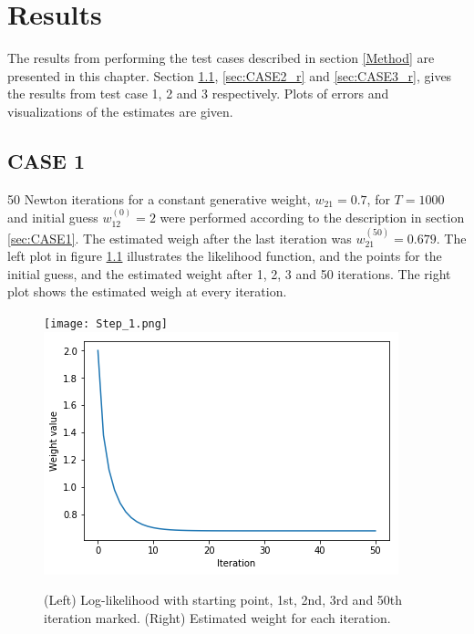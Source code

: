 
\chapter{Results}
\label{ch:results}

The results from performing the test cases described in section \ref{Method} are presented in this chapter. Section \ref{sec:CASE1_r}, \ref{sec:CASE2_r} and \ref{sec:CASE3_r}, gives the results from test case 1, 2 and 3 respectively. Plots of errors and visualizations of the estimates are given. 

\section{CASE 1}
\label{sec:CASE1_r}
50 Newton iterations for a constant generative weight, $w_{21} = 0.7$, for $T=1000$ and initial guess $w_{12}^{(0)} = 2$ were performed according to the description in section \ref{sec:CASE1}. The estimated weigh after the last iteration was $w_{21}^{(50)}=0.679$. The left plot in figure \ref{fig:Newton} illustrates the likelihood function, and the points for the initial guess, and the estimated weight after 1, 2, 3 and 50 iterations. The right plot shows the estimated weigh at every iteration.



\begin{figure}[hbt!]
\caption{(Left) Log-likelihood with starting point, 1st, 2nd, 3rd and 50th iteration marked. (Right) Estimated weight for each iteration.}
\label{fig:Newton}
    \centering
    \texttt{[image: Step\_1.png]}
    \includegraphics[scale=0.40]{fig/Step_1_it.png}
\end{figure}

